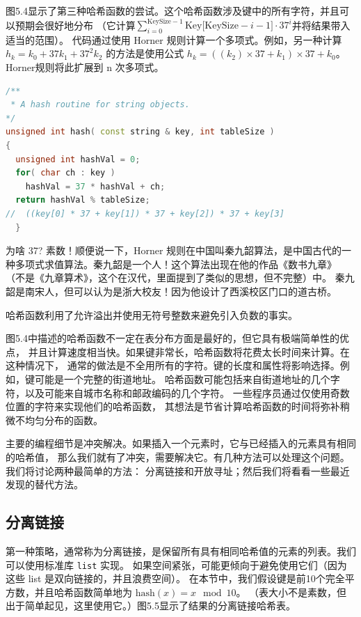 \documentclass[a4paper]{ctexart}
\theoremstyle{definition}
\theoremstyle{definition}
\begin{document}
图5.4显示了第三种哈希函数的尝试。这个哈希函数涉及键中的所有字符，并且可以预期会很好地分布
（它计算\(\sum_{i=0}^{\text{KeySize}-1} \text{Key[KeySize} - i - 1] \cdot 37^i\)并将结果带入适当的范围）。
代码通过使用 Horner 规则计算一个多项式。例如，另一种计算\(h_k = k_0 + 37k_1 + 37^2k_2\) 的方法是使用公式 \(h_k = ((k_2) \times 37 + k_1) \times 37 + k_0\)。
Horner规则将此扩展到 n 次多项式。

\begin{lstlisting}[language=C++]
/**
 * A hash routine for string objects.
*/
unsigned int hash( const string & key, int tableSize )
{
  unsigned int hashVal = 0;
  for( char ch : key )
    hashVal = 37 * hashVal + ch;
  return hashVal % tableSize;
//  ((key[0] * 37 + key[1]) * 37 + key[2]) * 37 + key[3]  
  }  
\end{lstlisting}

为啥 37? 素数！顺便说一下，Horner 规则在中国叫秦九韶算法，是中国古代的一种多项式求值算法。秦九韶是一个人！这个算法出现在他的作品《数书九章》
（不是《九章算术》，这个在汉代，里面提到了类似的思想，但不完整）中。
秦九韶是南宋人，但可以认为是浙大校友！因为他设计了西溪校区门口的道古桥。

哈希函数利用了允许溢出并使用无符号整数来避免引入负数的事实。

图5.4中描述的哈希函数不一定在表分布方面是最好的，但它具有极端简单性的优点，
并且计算速度相当快。如果键非常长，哈希函数将花费太长时间来计算。在这种情况下，
通常的做法是不全用所有的字符。键的长度和属性将影响选择。例如，键可能是一个完整的街道地址。
哈希函数可能包括来自街道地址的几个字符，以及可能来自城市名称和邮政编码的几个字符。
一些程序员通过仅使用奇数位置的字符来实现他们的哈希函数，
其想法是节省计算哈希函数的时间将弥补稍微不均匀分布的函数。

主要的编程细节是冲突解决。如果插入一个元素时，它与已经插入的元素具有相同的哈希值，
那么我们就有了冲突，需要解决它。有几种方法可以处理这个问题。我们将讨论两种最简单的方法：
分离链接和开放寻址；然后我们将看看一些最近发现的替代方法。

\subsection{分离链接}

第一种策略，通常称为分离链接，是保留所有具有相同哈希值的元素的列表。我们可以使用标准库 \verb|list| 实现。
如果空间紧张，可能更倾向于避免使用它们（因为这些 list 是双向链接的，并且浪费空间）。
在本节中，我们假设键是前10个完全平方数，并且哈希函数简单地为 $\text{hash}(x) = x \mod 10$。
（表大小不是素数，但出于简单起见，这里使用它。）图5.5显示了结果的分离链接哈希表。
\end{document}
